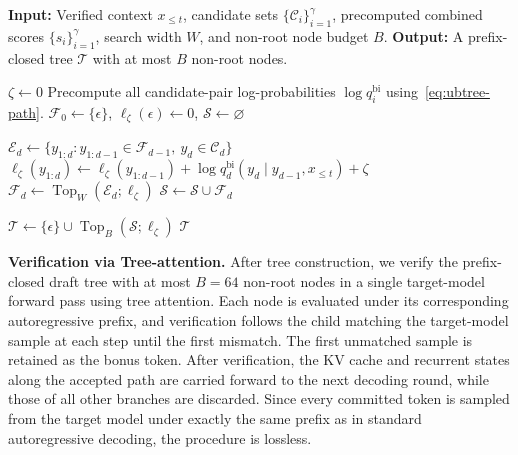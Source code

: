   \begin{algorithm}[t]
  \caption{UBTree Construction from Precomputed Scores}
  \label{alg:ubtree-construction}
  \begin{algorithmic}[1]
      \Statex \textbf{Input:}
      Verified context $x_{\le t}$,
      candidate sets $\{\mathcal C_i\}_{i=1}^{\gamma}$,
      precomputed combined scores $\{s_i\}_{i=1}^{\gamma}$,
      search width $W$, and non-root node budget $B$.
      \Statex \textbf{Output:}
      A prefix-closed tree $\mathcal T$
      with at most $B$ non-root nodes.

      \State $\zeta \gets 0$
      \State Precompute all candidate-pair log-probabilities
      $\log q_i^{\mathrm{bi}}$ using~\eqref{eq:ubtree-path}.
      \State $\mathcal F_0 \gets \{\epsilon\}$,
      $\ell_\zeta(\epsilon) \gets 0$,
      $\mathcal S \gets \varnothing$

          \State $\mathcal E_d \gets
          \{y_{1:d} :
          y_{1:d-1}\in\mathcal F_{d-1},\
          y_d\in\mathcal C_d\}$
              \State $\ell_\zeta(y_{1:d}) \gets
              \ell_\zeta(y_{1:d-1})
              + \log q_d^{\mathrm{bi}}
              (y_d\mid y_{d-1},x_{\le t})
              + \zeta$
          \EndFor
          \State $\mathcal F_d \gets
          \operatorname{Top}_{W}(\mathcal E_d;\ell_\zeta)$
          \State $\mathcal S \gets
          \mathcal S \cup \mathcal F_d$
      \EndFor

      \State $\mathcal T \gets
      \{\epsilon\}\cup
      \operatorname{Top}_{B}(\mathcal S;\ell_\zeta)$
      \State \Return $\mathcal T$
  \end{algorithmic}
  \end{algorithm}

\noindent\textbf{Verification via Tree-attention.}
After tree construction, we verify the prefix-closed draft tree with at most \(B=64\) non-root nodes in a single target-model forward pass using tree attention. Each node is evaluated under its corresponding autoregressive prefix, and verification follows the child matching the target-model sample at each step until the first mismatch. The first unmatched sample is retained as the bonus token. After verification, the KV cache and recurrent states along the accepted path are carried forward to the next decoding round, while those of all other branches are discarded. Since every committed token is sampled from the target model under exactly the same prefix as in standard autoregressive decoding, the procedure is lossless.